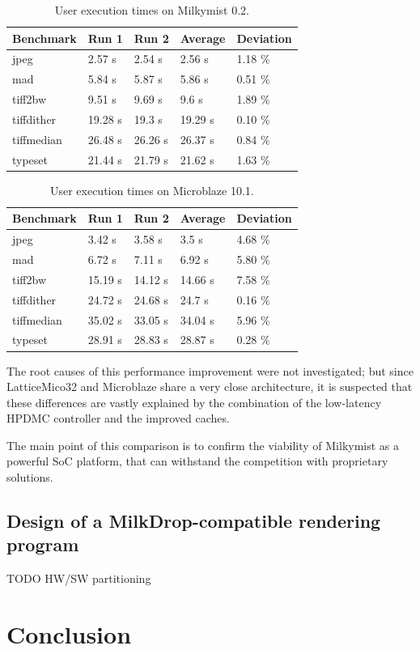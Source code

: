 \documentclass[a4paper,11pt]{kthesis}
\begin{document}
\begin{table}
\centering
\begin{tabular}{|l|l|l|l|l|}
\hline
\textbf{Benchmark} & \textbf{Run 1} & \textbf{Run 2} & \textbf{Average} & \textbf{Deviation}  \\
\hline
jpeg & 2.57 s & 2.54 s & 2.56 s & 1.18 \% \\
\hline
mad & 5.84 s & 5.87 s & 5.86 s & 0.51 \% \\
\hline
tiff2bw & 9.51 s & 9.69 s & 9.6 s & 1.89 \% \\
\hline
tiffdither & 19.28 s & 19.3 s & 19.29 s & 0.10 \% \\
\hline
tiffmedian & 26.48 s & 26.26 s & 26.37 s & 0.84 \% \\
\hline
typeset & 21.44 s & 21.79 s & 21.62 s & 1.63 \% \\
\hline
\end{tabular}
\label{tab:milkymistspeed}
\caption{User execution times on Milkymist 0.2.}
\end{table}

\begin{table}
\centering
\begin{tabular}{|l|l|l|l|l|}
\hline
\textbf{Benchmark} & \textbf{Run 1} & \textbf{Run 2} & \textbf{Average} & \textbf{Deviation}  \\
\hline
jpeg & 3.42 s & 3.58 s & 3.5 s & 4.68 \% \\
\hline
mad & 6.72 s & 7.11 s & 6.92 s & 5.80 \% \\
\hline
tiff2bw & 15.19 s & 14.12 s & 14.66 s & 7.58 \% \\
\hline
tiffdither & 24.72 s & 24.68 s & 24.7 s & 0.16 \% \\
\hline
tiffmedian & 35.02 s & 33.05 s & 34.04 s & 5.96 \% \\
\hline
typeset & 28.91 s & 28.83 s & 28.87 s & 0.28 \% \\
\hline
\end{tabular}
\label{tab:microblazespeed}
\caption{User execution times on Microblaze 10.1.}
\end{table}

The root causes of this performance improvement were not investigated; but since LatticeMico32 and Microblaze share a very close architecture, it is suspected that these differences are vastly explained by the combination of the low-latency HPDMC controller and the improved caches.

The main point of this comparison is to confirm the viability of Milkymist as a powerful SoC platform, that can withstand the competition with proprietary solutions.

\section{Design of a MilkDrop-compatible rendering program}
TODO HW/SW partitioning

\chapter{Conclusion}

{}

\end{document}
